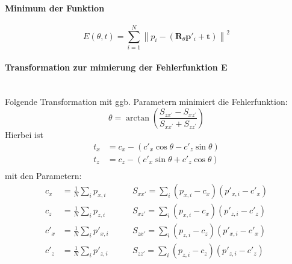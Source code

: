 \paragraph{Minimum der Funktion}
$$
	E(\theta, t)=\sum_{i=1}^N \left\| p_i - \left( \boldsymbol R_\theta
		\boldsymbol p'_i + \boldsymbol t \right) \right\| ^2
$$

\paragraph{Transformation zur mimierung der Fehlerfunktion E} \hfill \\
Folgende Transformation mit ggb. Parametern minimiert die Fehlerfunktion:
$$
	\theta=\arctan \left(\frac{S_{z x^{\prime}}-S_{x z^{\prime}}}{S_{x
		x^{\prime}}+S_{z z^{\prime}}}\right)
$$
Hierbei ist
\begin{align*}
	t_x &= c_x - \left( c'_x \cos\theta - c'_z \sin\theta \right) \\
	t_z &= c_z - \left( c'_x \sin\theta + c'_z \cos\theta \right) \\
\end{align*}
mit den Parametern:
\begin{align*}
	c_x &= \frac1N \sum_i p_{x,i} \qquad & S_{xx'} = \sum_i (p_{x,i} - c_x)
		(p'_{x,i} - c'_x) \\
	c_z &= \frac1N \sum_i p_{z,i} \qquad & S_{xz'} = \sum_i (p_{x,i} - c_x)
		(p'_{z,i} - c'_z) \\
	c'_x &= \frac1N \sum_i p'_{x,i} \qquad & S_{zx'} = \sum_i (p_{z,i} - c_z)
		(p'_{x,i} - c'_x) \\
	c'_z &= \frac1N \sum_i p'_{z,i} \qquad & S_{zz'} = \sum_i (p_{z,i} - c_z)
		(p'_{z,i} - c'_z)
\end{align*}

